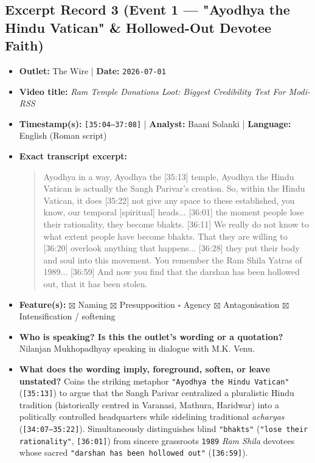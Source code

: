 \documentclass[10pt,a4paper]{article}
\begin{document}
\subsection*{Excerpt Record 3 (Event 1 --- "Ayodhya the Hindu Vatican" \& Hollowed-Out Devotee Faith)}
\begin{itemize}[leftmargin=1.5em, itemsep=3pt, topsep=4pt]
  \item \textbf{Outlet:} The Wire | \textbf{Date:} \texttt{2026-07-01}
  \item \textbf{Video title:} \textit{Ram Temple Donations Loot: Biggest Credibility Test For Modi-RSS}
  \item \textbf{Timestamp(s):} \texttt{[35:04--37:08]} | \textbf{Analyst:} Baani Solanki | \textbf{Language:} English (Roman script)
  \item \textbf{Exact transcript excerpt:}
    \begin{quote}\small{} Ayodhya in a way, Ayodhya the [35:13] temple, Ayodhya the Hindu Vatican is actually the Sangh Parivar's creation. So, within the Hindu Vatican, it does [35:22] not give any space to these established, you know, our temporal [spiritual] heads... [36:01] the moment people lose their rationality, they become bhakts. [36:11] We really do not know to what extent people have become bhakts. That they are willing to [36:20] overlook anything that happens... [36:28] they put their body and soul into this movement. You remember the Ram Shila Yatras of 1989... [36:59] And now you find that the darshan has been hollowed out, that it has been stolen.\end{quote}
  \item \textbf{Feature(s):} $\boxtimes$ Naming $\boxtimes$ Presupposition $\square$ Agency $\boxtimes$ Antagonisation $\boxtimes$ Intensification / softening
  \item \textbf{Who is speaking? Is this the outlet's wording or a quotation?} Nilanjan Mukhopadhyay speaking in dialogue with M.K. Venu.
  \item \textbf{What does the wording imply, foreground, soften, or leave unstated?} Coins the striking metaphor \texttt{"Ayodhya the Hindu Vatican"} (\texttt{[35:13]}) to argue that the Sangh Parivar centralized a pluralistic Hindu tradition (historically centred in Varanasi, Mathura, Haridwar) into a politically controlled headquarters while sidelining traditional \textit{acharyas} (\texttt{[34:07--35:22]}). Simultaneously distinguishes blind \texttt{"bhakts"} (\texttt{"lose their rationality"}, \texttt{[36:01]}) from sincere grassroots \texttt{1989} \textit{Ram Shila} devotees whose sacred \texttt{"darshan has been hollowed out"} (\texttt{[36:59]}).

\end{itemize}
\end{document}
